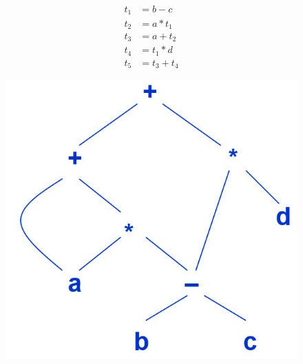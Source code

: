 \begin{minipage}{0.5\linewidth}
\[\begin{aligned}
t_1 &= b - c\\
t_2 &= a * t_1\\
t_3 &= a + t_2\\
t_4 &= t_1 * d\\
t_5 &= t_3 + t_4
\end{aligned}\]
\end{minipage}
\begin{minipage}{0.5\linewidth}
\begin{figure}[H]
\centering
\includegraphics[width=0.5\linewidth]{fig/three-addr-code-dag.jpg}
\end{figure}
\end{minipage}

